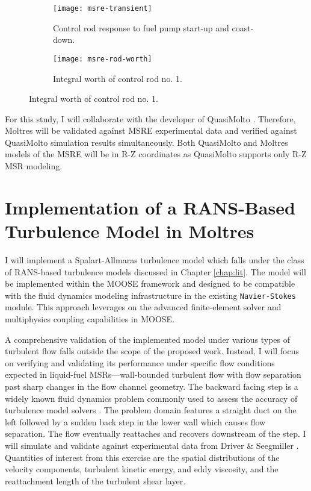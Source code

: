 \begin{figure}[htb!]
  \centering
  \begin{subfigure}[t]{.49\textwidth}
    \centering
    \texttt{[image: msre-transient]}
    \caption{Control rod response to fuel pump start-up and coast-down.}
    \label{fig:msre-trans}
  \end{subfigure}
  \hfill
  \begin{subfigure}[t]{.49\textwidth}
    \centering
    \texttt{[image: msre-rod-worth]}
    \caption{Integral worth of control rod no. 1.}
    \label{fig:msre-rod}
  \end{subfigure}
\end{figure}

For this study, I will collaborate
with the developer of QuasiMolto \cite{reynolds_analysis_2023}. Therefore, Moltres
will be validated against \gls{MSRE} experimental data and verified against QuasiMolto simulation
results simultaneously. Both QuasiMolto and Moltres models of the \gls{MSRE} will be in R-Z
coordinates as QuasiMolto supports only R-Z \gls{MSR} modeling.

\section{Implementation of a RANS-Based Turbulence Model in Moltres}

I will implement a Spalart-Allmaras turbulence model which falls under the class of
\gls{RANS}-based turbulence models discussed in Chapter \ref{chap:lit}. The
model will be implemented within the \gls{MOOSE} framework and
designed to be compatible with the fluid dynamics modeling infrastructure in
the existing \texttt{Navier-Stokes} module. This approach leverages on the
advanced finite-element solver and multiphysics coupling capabilities in
\gls{MOOSE}.

A comprehensive validation of the implemented model under various types of
turbulent flow falls outside the scope of the proposed work. Instead, I will
focus on verifying and validating its performance under specific flow conditions expected in
liquid-fuel \glspl{MSR}---wall-bounded turbulent flow with flow separation past
sharp changes in the flow channel geometry. The backward facing step is a
widely known fluid dynamics problem commonly used to assess the accuracy of
turbulence model solvers \cite{lasher_computation_1992}.
The problem domain features a straight duct
on the left followed by a sudden back step in the lower wall which causes flow
separation. The flow eventually reattaches and recovers downstream of the step.
I will simulate and validate against experimental data from Driver \&
Seegmiller \cite{driver_features_1985}. Quantities of interest from this
exercise are the spatial distributions of the velocity components, turbulent
kinetic energy, and eddy viscosity, and the reattachment length of the
turbulent shear layer.


